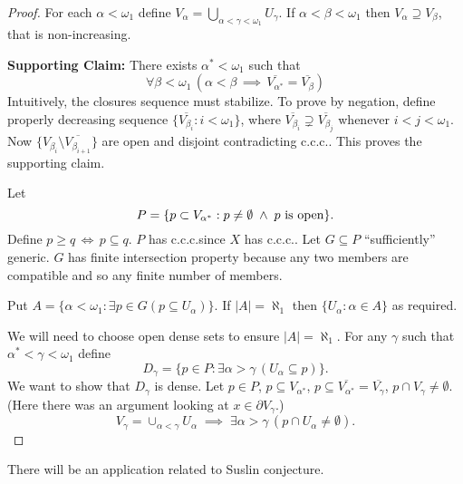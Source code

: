\documentclass[11pt,pdftex,twoside,a4paper]{article}
\newcommand{\B}[1]{\textbf{#1}}
\newcommand{\ccc}{c.c.c.}
\theoremstyle{definition}
\begin{document}
\begin{proof}
For each \(\alpha <\omega_1\) define 
\(V_\alpha = \bigcup_{\alpha<\gamma<\omega_1} U_\gamma\).
If \(\alpha<\beta<\omega_1\) then \(V_\alpha \supseteq V_\beta\),
that is non-increasing.

\B{Supporting Claim:} There exists \(\alpha^* <\omega_1\) 
such that 
\begin{equation*}
\forall \beta<\omega_1\,\left(\alpha<\beta\,\implies\, 
 \overline{V_{\alpha^*}} = \overline{V_\beta}\right)
\end{equation*}
Intuitively, the closures sequence must stabilize.
To prove by negation, define properly decreasing sequence
\(\{\overline{V_{\beta_i}}: i < \omega_1\}\), 
where \(\overline{V_{\beta_i}} \supsetneq \overline{V_{\beta_j}}\)
whenever \(i<j<\omega_1\). 
Now \(\{V_{\beta_i} \setminus \overline{V_{\beta_{i+1}}}\}\)
are open and disjoint contradicting \ccc.
This proves the supporting claim.

Let
\begin{equation*}
P = \{p \subset V_{\alpha^*}: p\neq\emptyset\;\land\; p\textnormal{ is open}\}.
\end{equation*}
Define \(p\geq q\,\iff\, p\subseteq q\).
$P$ has \ccc since $X$ has \ccc.
Let \(G\subseteq P\) ``sufficiently'' generic.
$G$ has finite intersection property because
any two members are compatible and so any finite number of members.

Put \(A=\{\alpha<\omega_1: \exists p\in G (p\subseteq U_\alpha)\}\).
If \(|A|=\aleph_1\) then \(\{U_\alpha: \alpha\in A\}\) as required.

We will need to choose open dense sets to ensure \(|A|=\aleph_1\).
For any \(\gamma\) such that \(\alpha^*<\gamma<\omega_1\) define 
\begin{equation*}
D_\gamma = \{p\in P: \exists \alpha>\gamma\,(U_\alpha \subseteq p)\}.
\end{equation*}
We want to show that \(D_\gamma\) is dense.
Let \(p\in P\), \(p\subseteq V_{\alpha^*}\), 
\(p\subseteq \overline{V_{\alpha^*}} = \overline{V_\gamma}\),
\(p \cap V_\gamma \neq \emptyset\).
(Here there was an argument looking at \(x\in \partial V_\gamma\).)
\begin{equation*}
V_\gamma = \cup_{\alpha<\gamma} U_\alpha\;\implies\;
 \exists \alpha>\gamma\,(p\cap U_\alpha \neq \emptyset).
\end{equation*}
\end{proof}

There will be an application related to Suslin conjecture.
\end{document}
